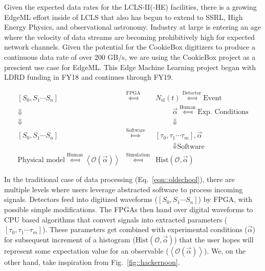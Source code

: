 \documentclass[aps]{revtex4}
\newcommand{\expect}[1]{\ensuremath{\left\langle #1 \right\rangle}}
\begin{document}
Given the expected data rates for the LCLS-II(-HE) facilities, there is a growing EdgeML effort inside of LCLS that also has begun to extend to SSRL, High Energy Physics, and observational astronomy.  
Industry at large is entering an age where the velocity of data streams are becoming prohibitively high for expected network channels.
Given the potential for the CookieBox digitizers to produce a continuous data rate of over 200 GB/s, we are using the CookieBox project as a prescient use case for EdgeML.
This Edge Machine Learning project began with LDRD funding in FY18 and continues through FY19.

\begin{eqnarray}
\left[S_0, S_1 \cdots S_n\right] &\stackrel{\textrm{FPGA}}{\Longmapsfrom}& N_{\textrm{el}} (t) \stackrel{\textrm{Detector}}{\Longmapsfrom} \textrm{Event} \nonumber\\
\Downarrow\hspace{1cm}&&\hspace{1cm} \vec{\alpha} \stackrel{\textrm{Human}}{\Longmapsfrom} \textrm{Exp. Conditions}\nonumber\\
\Downarrow\hspace{1cm}&&\hspace{1cm} \Downarrow\nonumber\\
\left[S_0, S_1 \cdots S_n\right] &\stackrel{\textrm{Software}}{\Longmapsto}& \left[\tau_0 ,\tau_1 \cdots \tau_m \right] , \vec{\alpha} \nonumber\\%
   & &\hspace{1cm}\Downarrow \textrm{Software}\nonumber\\
 \textrm{Physical model} \stackrel{\textrm{Human}}{\Longmapsfrom} \expect{\mathcal{O} \left(\vec{\alpha}\right)} &\stackrel{\textrm{Simulation}}{\Longmapsfrom}& \mbox{Hist}\left( \mathcal{O} , \vec{\alpha} \right) \label{eqn::oldschool}
\end{eqnarray}

In the traditional case of data processing (Eq.~\ref{eqn::oldschool}), there are multiple levels where users leverage abstracted software to process incoming signals.
Detectors feed into digitized waveforms ($\left[S_0, S_1 \cdots S_n\right]$) by FPGA, with possible simple modifications.
The FPGAs then hand over digital waveforms to CPU based algorithms that convert signals into extracted parameters ($\left[\tau_0 ,\tau_1 \cdots \tau_m \right]$).
These parameters get combined with experimental conditions ($\vec{\alpha}$) for subsequent increment of a histogram ($\mbox{Hist}\left( \mathcal{O} , \vec{\alpha} \right)$) that the user hopes will represent some expectation value for an observable ($\expect{\mathcal{O} \left(\vec{\alpha}\right)}$).
We, on the other hand, take inspiration from Fig.~\ref{fig::hackernoon}.
\end{document}
